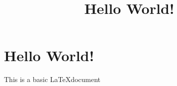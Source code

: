 \documentclass{article}
\begin{document}
\title{Hello World!}
\maketitle

\section{Hello World!}
This is a basic \LaTeX document
\end{document}
